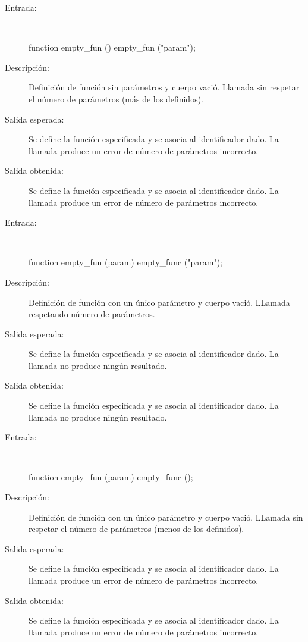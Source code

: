	\begin{description}
		\item [Entrada:] \hfill \\
\begin{myverbatim}
   function empty_fun () { } 
   empty_fun ("param");
\end{myverbatim}
		\item [Descripción:] Definición de función sin parámetros y cuerpo vació. Llamada sin respetar el número de parámetros (más de los definidos). 
		\item [Salida esperada:] Se define la función especificada y se asocia al identificador dado. La llamada produce un error de número de parámetros incorrecto.
		\item [Salida obtenida:] Se define la función especificada y se asocia al identificador dado. La llamada produce un error de número de parámetros incorrecto.
	\end{description}

	\begin{description}
		\item [Entrada:] \hfill \\
\begin{myverbatim}
   function empty_fun (param) { } 
   empty_func ("param");
\end{myverbatim}
		\item [Descripción:] Definición de función con un único parámetro y cuerpo vació. LLamada respetando número de parámetros.
		\item [Salida esperada:] Se define la función especificada y se asocia al identificador dado. La llamada no produce ningún resultado.
		\item [Salida obtenida:] Se define la función especificada y se asocia al identificador dado. La llamada no produce ningún resultado.
	\end{description}

	\begin{description}
		\item [Entrada:] \hfill \\
\begin{myverbatim}
   function empty_fun (param) { } 
   empty_func ();
\end{myverbatim}
		\item [Descripción:] Definición de función con un único parámetro y cuerpo vació. LLamada sin respetar el número de parámetros (menos de los definidos).
		\item [Salida esperada:] Se define la función especificada y se asocia al identificador dado. La llamada produce un error de número de parámetros incorrecto.
		\item [Salida obtenida:] Se define la función especificada y se asocia al identificador dado. La llamada produce un error de número de parámetros incorrecto.
	\end{description}

